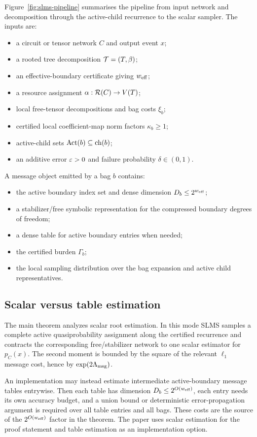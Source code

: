 Figure~\ref{fig:slms-pipeline} summarises the pipeline from input network and decomposition through the active-child recurrence to the scalar sampler. The inputs are:
\begin{itemize}[leftmargin=1.2cm]
\item a circuit or tensor network \(C\) and output event \(x\);
\item a rooted tree decomposition \(\mathcal{T}=(T,\beta)\);
\item an effective-boundary certificate giving \(w_{\mathrm{eff}}\);
\item a resource assignment \(\alpha:\mathcal{R}(C)\to V(T)\);
\item local free-tensor decompositions and bag costs \(\xi_b\);
\item certified local coefficient-map norm factors \(\kappa_b\ge 1\);
\item active-child sets \(\operatorname{Act}(b)\subseteq\operatorname{ch}(b)\);
\item an additive error \(\varepsilon>0\) and failure probability \(\delta\in(0,1)\).
\end{itemize}

A message object emitted by a bag \(b\) contains:
\begin{itemize}[leftmargin=1.2cm]
\item the active boundary index set and dense dimension \(D_b\le 2^{w_{\mathrm{eff}}}\);
\item a stabilizer/free symbolic representation for the compressed boundary degrees of freedom;
\item a dense table for active boundary entries when needed;
\item the certified burden \(\Gamma_b\);
\item the local sampling distribution over the bag expansion and active child representatives.
\end{itemize}

\subsection{Scalar versus table estimation}

The main theorem analyzes scalar root estimation. In this mode SLMS samples a complete active quasiprobability assignment along the certified recurrence and contracts the corresponding free/stabilizer network to one scalar estimator for \(p_C(x)\). The second moment is bounded by the square of the relevant \(\ell_1\) message cost, hence by \(\exp(2\Lambda_{\mathrm{msg}})\).

An implementation may instead estimate intermediate active-boundary message tables entrywise. Then each table has dimension \(D_b\le 2^{O(w_{\mathrm{eff}})}\), each entry needs its own accuracy budget, and a union bound or deterministic error-propagation argument is required over all table entries and all bags. These costs are the source of the \(2^{O(w_{\mathrm{eff}})}\) factor in the theorem. The paper uses scalar estimation for the proof statement and table estimation as an implementation option.

